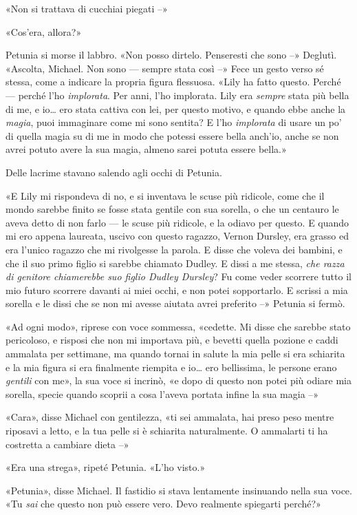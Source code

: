 «Non si trattava di cucchiai piegati –»

«Cos’era, allora?»

Petunia si morse il labbro. «Non posso dirtelo. Penseresti che sono –» Deglutì. «Ascolta, Michael. Non sono — sempre stata così –» Fece un gesto verso sé stessa, come a indicare la propria figura flessuosa. «Lily ha fatto questo. Perché — perché l’ho \emph{implorata}. Per anni, l’ho implorata. Lily era \emph{sempre} stata più bella di me, e io… ero stata cattiva con lei, per questo motivo, e quando ebbe anche la \emph{magia}, puoi immaginare come mi sono sentita? E l’ho \emph{implorata} di usare un po’ di quella magia su di me in modo che potessi essere bella anch’io, anche se non avrei potuto avere la sua magia, almeno sarei potuta essere bella.»

Delle lacrime stavano salendo agli occhi di Petunia.

«E Lily mi rispondeva di no, e si inventava le scuse più ridicole, come che il mondo sarebbe finito se fosse stata gentile con sua sorella, o che un centauro le aveva detto di non farlo — le scuse più ridicole, e la odiavo per questo. E quando mi ero appena laureata, uscivo con questo ragazzo, Vernon Dursley, era grasso ed era l’unico ragazzo che mi rivolgesse la parola. E disse che voleva dei bambini, e che il suo primo figlio si sarebbe chiamato Dudley. E dissi a me stessa, \emph{che razza di genitore chiamerebbe suo figlio Dudley Dursley}? Fu come veder scorrere tutto il mio futuro scorrere davanti ai miei occhi, e non potei sopportarlo. E scrissi a mia sorella e le dissi che se non mi avesse aiutata avrei preferito –»
Petunia si fermò.

«Ad ogni modo», riprese con voce sommessa, «cedette. Mi disse che sarebbe stato pericoloso, e risposi che non mi importava più, e bevetti quella pozione e caddi ammalata per settimane, ma quando tornai in salute la mia pelle si era schiarita e la mia figura si era finalmente riempita e io… ero bellissima, le persone erano \emph{gentili} con me», la sua voce si incrinò, «e dopo di questo non potei più odiare mia sorella, specie quando scoprii a cosa l’aveva portata infine la sua magia –»

«Cara», disse Michael con gentilezza, «ti sei ammalata, hai preso peso mentre riposavi a letto, e la tua pelle si è schiarita naturalmente. O ammalarti ti ha costretta a cambiare dieta –»

«Era una strega», ripeté Petunia. «L’ho visto.»

«Petunia», disse Michael. Il fastidio si stava lentamente insinuando nella sua voce. «Tu \emph{sai} che questo non può essere vero. Devo realmente spiegarti perché?»

